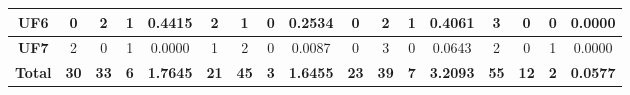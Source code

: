\begin{table*}[t]
\begin{tabular}{c|c|c|c|c|c|c|c|c|c|c|c|c|c|c|c|c|}
\multicolumn{1}{|c|}{\textbf{UF6}}   & 0                   & 2                     & 1                          & 0.4415          & 2                   & 1                     & 0                          & 0.2534          & 0                   & 2                     & 1                          & 0.4061          & 3                   & 0                     & 0                          & 0.0000          \\ \hline
\multicolumn{1}{|c|}{\textbf{UF7}}   & 2                   & 0                     & 1                          & 0.0000          & 1                   & 2                     & 0                          & 0.0087          & 0                   & 3                     & 0                          & 0.0643          & 2                   & 0                     & 1                          & 0.0000          \\ \hline
\multicolumn{1}{|c|}{\textbf{Total}} & \textbf{30}         & \textbf{33}           & \textbf{6}                 & \textbf{1.7645} & \textbf{21}         & \textbf{45}           & \textbf{3}                 & \textbf{1.6455} & \textbf{23}         & \textbf{39}           & \textbf{7}                 & \textbf{3.2093} & \textbf{55}         & \textbf{12}           & \textbf{2}                 & \textbf{0.0577} \\ \hline
\end{tabular}%
\end{table*}

